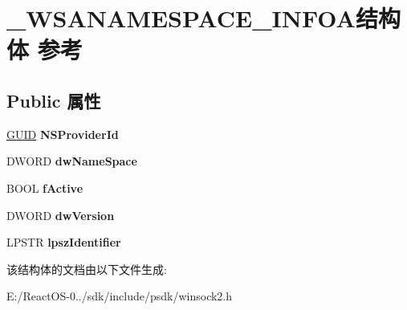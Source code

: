 \hypertarget{struct___w_s_a_n_a_m_e_s_p_a_c_e___i_n_f_o_a}{}\section{\+\_\+\+W\+S\+A\+N\+A\+M\+E\+S\+P\+A\+C\+E\+\_\+\+I\+N\+F\+O\+A结构体 参考}
\label{struct___w_s_a_n_a_m_e_s_p_a_c_e___i_n_f_o_a}
\subsection*{Public 属性}
\begin{DoxyCompactItemize}
\item 
\mbox{\label{struct___w_s_a_n_a_m_e_s_p_a_c_e___i_n_f_o_a_ae5808a1e5a15692a19fb58cc8655e340}} 
\hyperlink{interface_g_u_i_d}{G\+U\+ID} {\bfseries N\+S\+Provider\+Id}
\item 
\mbox{\label{struct___w_s_a_n_a_m_e_s_p_a_c_e___i_n_f_o_a_a332062d3e7197d10ac06d692442da255}} 
D\+W\+O\+RD {\bfseries dw\+Name\+Space}
\item 
\mbox{\label{struct___w_s_a_n_a_m_e_s_p_a_c_e___i_n_f_o_a_a44888273c14b29582b8edc68fcc18de2}} 
B\+O\+OL {\bfseries f\+Active}
\item 
\mbox{\label{struct___w_s_a_n_a_m_e_s_p_a_c_e___i_n_f_o_a_aa0525b33446a20e8e65fd2c0d0e7ebdf}} 
D\+W\+O\+RD {\bfseries dw\+Version}
\item 
\mbox{\label{struct___w_s_a_n_a_m_e_s_p_a_c_e___i_n_f_o_a_a1c981b0eb7e430b8b19bf76d6d96dd15}} 
L\+P\+S\+TR {\bfseries lpsz\+Identifier}
\end{DoxyCompactItemize}


该结构体的文档由以下文件生成\+:\begin{DoxyCompactItemize}
\item 
E\+:/\+React\+O\+S-\/0../sdk/include/psdk/winsock2.\+h\end{DoxyCompactItemize}
